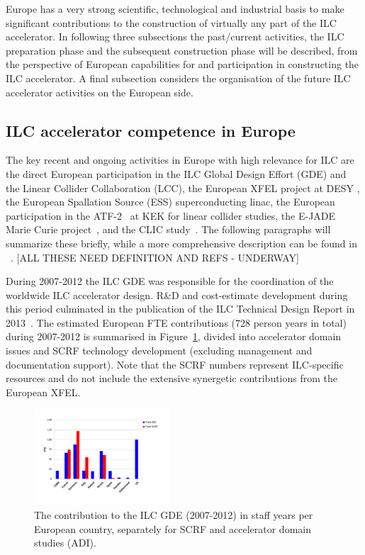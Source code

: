 \documentclass[%
 reprint,
 amsmath,amssymb,
 aps,
]{revtex4-1}
\begin{document}
Europe has a very strong scientific, technological and industrial basis to make significant contributions to the construction of virtually any part of the ILC accelerator. In following three subsections the past/current activities, the ILC preparation phase and the subsequent construction phase 
will be described, from the perspective of European capabilities for and participation in constructing the ILC accelerator. A final subsection considers the organisation of the future ILC accelerator activities on the European side. 

\subsection{ILC accelerator competence in Europe~\label{sec:competence:accelerator}}

The key recent and ongoing activities in Europe with high relevance for ILC are the direct
European participation in the ILC Global Design Effort (GDE) and the Linear Collider Collaboration (LCC),
the European XFEL project at DESY , the European Spallation Source (ESS) superconducting linac, the European participation in the ATF-2~\cite{Grishanov:2005ek,Grishanov:2006kx} at KEK for linear collider studies, the E-JADE Marie Curie project~\cite{ejade}, and the CLIC study~\cite{Aicheler:2012bya,Linssen:2012hp}. The following paragraphs will summarize these briefly, while a more comprehensive description can be found in ~\cite{ejade-report}. [ALL THESE NEED DEFINITION AND REFS - UNDERWAY]

During 2007-2012 the ILC GDE was responsible for the coordination of the worldwide ILC accelerator design. 
R\&D and cost-estimate development during this period culminated in the publication of the ILC Technical Design Report in 2013~\cite{Behnke:2013xla}. 
The estimated European FTE contributions (728 person years in total) during 2007-2012 is summarised in Figure~\ref{fig:PrePrep:ilcgde4}, 
divided into accelerator domain issues and SCRF technology development (excluding management and documentation support). 
Note that the SCRF numbers represent ILC-specific resources and do not include the extensive synergetic contributions from the European XFEL.

\begin{figure}[htbp]
\includegraphics[width=0.45\textwidth]{figures/EU-GDE-FTE-columns-per-country.pdf}
\caption{\label{fig:PrePrep:ilcgde4} The contribution to the ILC GDE (2007-2012) in staff years per European country, separately for SCRF and accelerator domain studies (ADI).}
\end{figure}
\end{document}
